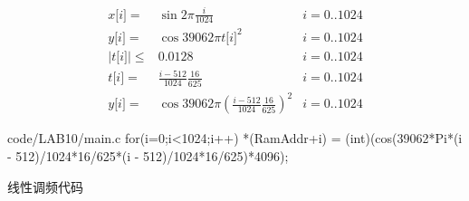 \documentclass[../main]{subfiles}
\begin{document}
\begin{align}
  \label{eq:sine}
  x\lbrack i\rbrack = & \sin 2\pi \frac{i}{1024} & i = 0..1024\\
  \label{eq:k}
  y\lbrack i\rbrack = & \cos 39062 \pi {t\lbrack i\rbrack}^2 & i = 0..1024\\
  \label{eq:t}
  \lvert t\lbrack i\rbrack\rvert \leqslant & 0.0128 & i = 0..1024\\
  \label{eq:ta}
  t\lbrack i\rbrack = & \frac{i - 512}{1024}\frac{16}{625} & i = 0..1024\\
  \label{eq:lfm}
  y\lbrack i\rbrack = & \cos 39062 \pi {\left(\frac{i - 512}{1024}
  \frac{16}{625}\right)}^2 & i = 0..1024
\end{align}

\begin{listing}[htbp]
  \centering
\begin{langPyOne}[c][firstnumber = 68]{code/LAB10/main.c}
for(i=0;i<1024;i++)
	*(RamAddr+i) = (int)(cos(39062*Pi*(i - 512)/1024*16/625*(i - 512)/1024*16/625)*4096);
\end{langPyOne}
  \caption{线性调频代码}%
  \label{lst:lfm}
\end{listing}
\end{document}
